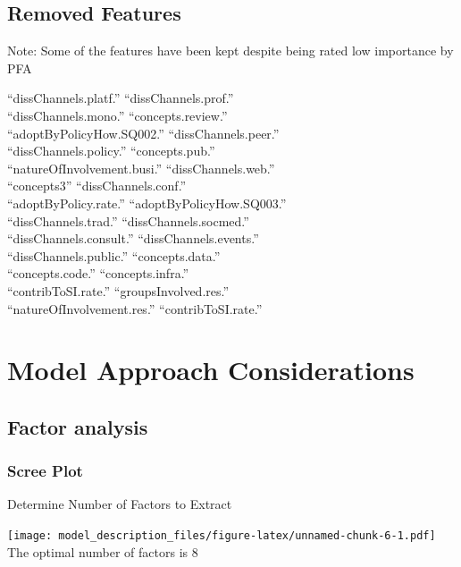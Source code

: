 \documentclass[
]{article}
\begin{document}
\hypertarget{removed-features}{%
\subsection{Removed Features}\label{removed-features}}

Note: Some of the features have been kept despite being rated low
importance by PFA

``dissChannels.platf.'' ``dissChannels.prof.''\\
``dissChannels.mono.'' ``concepts.review.''\\
``adoptByPolicyHow.SQ002.'' ``dissChannels.peer.''\\
``dissChannels.policy.'' ``concepts.pub.''\\
``natureOfInvolvement.busi.'' ``dissChannels.web.''\\
``concepts3'' ``dissChannels.conf.''\\
``adoptByPolicy.rate.'' ``adoptByPolicyHow.SQ003.''\\
``dissChannels.trad.'' ``dissChannels.socmed.''\\
``dissChannels.consult.'' ``dissChannels.events.''\\
``dissChannels.public.'' ``concepts.data.''\\
``concepts.code.'' ``concepts.infra.''\\
``contribToSI.rate.'' ``groupsInvolved.res.''\\
``natureOfInvolvement.res.'' ``contribToSI.rate.''

\hypertarget{model-approach-considerations}{%
\section{Model Approach
Considerations}\label{model-approach-considerations}}

\hypertarget{factor-analysis}{%
\subsection{Factor analysis}\label{factor-analysis}}

\hypertarget{scree-plot}{%
\subsubsection{Scree Plot}\label{scree-plot}}

Determine Number of Factors to Extract

\texttt{[image: model\_description\_files/figure-latex/unnamed-chunk-6-1.pdf]}
The optimal number of factors is 8
\end{document}
